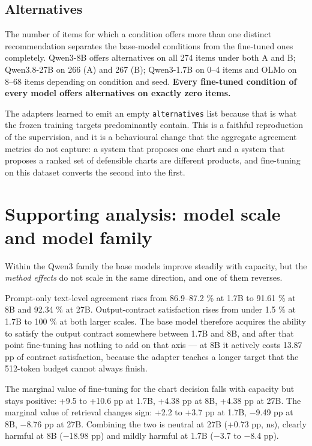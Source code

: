 \subsection{Alternatives}

The number of items for which a condition offers more than one distinct recommendation separates the base-model conditions from the fine-tuned ones completely. Qwen3-8B offers alternatives on all 274 items under both A and B; Qwen3.8-27B on 266 (A) and 267 (B); Qwen3-1.7B on 0--4 items and OLMo on 8--68 items depending on condition and seed. \textbf{Every fine-tuned condition of every model offers alternatives on exactly zero items.}

The adapters learned to emit an empty \texttt{alternatives} list because that is what the frozen training targets predominantly contain. This is a faithful reproduction of the supervision, and it is a behavioural change that the aggregate agreement metrics do not capture: a system that proposes one chart and a system that proposes a ranked set of defensible charts are different products, and fine-tuning on this dataset converts the second into the first.

\section{Supporting analysis: model scale and model family}

Within the Qwen3 family the base models improve steadily with capacity, but the \emph{method effects} do not scale in the same direction, and one of them reverses.

Prompt-only text-level agreement rises from 86.9--87.2 \% at 1.7B to 91.61 \% at 8B and 92.34 \% at 27B. Output-contract satisfaction rises from under 1.5 \% at 1.7B to 100 \% at both larger scales. The base model therefore acquires the ability to satisfy the output contract somewhere between 1.7B and 8B, and after that point fine-tuning has nothing to add on that axis --- at 8B it actively costs 13.87 pp of contract satisfaction, because the adapter teaches a longer target that the 512-token budget cannot always finish.

The marginal value of fine-tuning for the chart decision falls with capacity but stays positive: +9.5 to +10.6 pp at 1.7B, +4.38 pp at 8B, +4.38 pp at 27B. The marginal value of retrieval changes sign: +2.2 to +3.7 pp at 1.7B, \ensuremath{-}9.49 pp at 8B, \ensuremath{-}8.76 pp at 27B. Combining the two is neutral at 27B (+0.73 pp, ns), clearly harmful at 8B (\ensuremath{-}18.98 pp) and mildly harmful at 1.7B (\ensuremath{-}3.7 to \ensuremath{-}8.4 pp).

